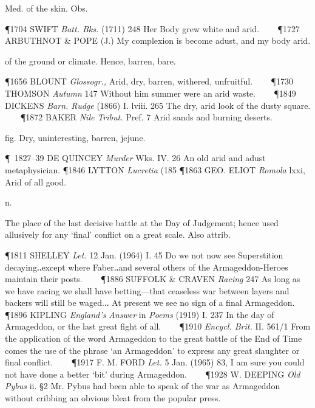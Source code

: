 \begin{description}[wide, labelwidth=!, labelindent=0pt]
\begin{myenumerate}
 Med. of the skin. Obs.

\P 1704 SWIFT  \textit{Batt. Bks.} (1711) 248 Her Body grew white and arid.    
\P 1727 ARBUTHNOT \& POPE (J.) My complexion is become adust, and my body arid.

 of the ground or climate. Hence, barren, bare.

\P 1656 BLOUNT  \textit{Glossogr.,} Arid, dry, barren, withered, unfruitful.    
\P 1730 THOMSON  \textit{Autumn} 147 Without him summer were an arid waste.    
\P 1849 DICKENS  \textit{Barn. Rudge} (1866) I. lviii. 265 The dry, arid look of the dusty square.    
\P 1872 BAKER  \textit{Nile Tribut.} Pref. 7 Arid sands and burning deserts.

 fig. Dry, uninteresting, barren, jejune.

\P 1827–39 DE QUINCEY \textit{Murder} Wks. IV. 26 An old arid and adust metaphysician.
\P 1846 LYTTON  \textit{Lucretia} (185
\P 1863 GEO. ELIOT \textit{Romola} lxxi, Arid of all good.
\end{myenumerate}


 n.

\noindent {}

\vspace{-0.3cm}

\noindent
The place of the last decisive battle at the Day of Judgement; hence used allusively for any ‘final’ conflict on a great scale. Also attrib.

\P 1811 SHELLEY  \textit{Let.} 12 Jan. (1964) I. 45 Do we not now see Superstition decaying‥except where Faber‥and several others of the Armageddon-Heroes maintain their posts.    
\P 1886 SUFFOLK \& CRAVEN  \textit{Racing} 247 As long as we have racing we shall have betting—that ceaseless war between layers and backers will still be waged.‥ At present we see no sign of a final Armageddon.    
\P 1896 KIPLING  \textit{England's Answer} in \textit{Poems} (1919) I. 237 In the day of Armageddon, or the last great fight of all.    
\P 1910 \textit{Encycl. Brit.} II. 561/1 From the application of the word Armageddon to the great battle of the End of Time comes the use of the phrase ‘an Armageddon’ to express any great slaughter or final conflict.    
\P 1917 F. M. FORD  \textit{Let.} 5 Jan. (1965) 83, I am sure you could not have done a better ‘bit’ during Armageddon.    
\P 1928 W. DEEPING  \textit{Old Pybus} ii. §2 Mr. Pybus had been able to speak of the war as Armageddon without cribbing an obvious bleat from the popular press.



\end{description}
